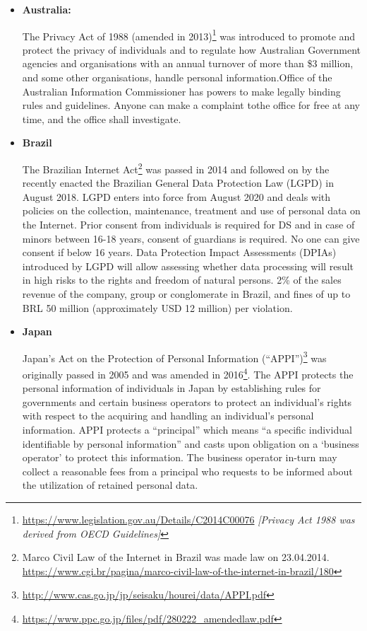 \begin{multicols}{2}
\begin{itemize}
\item[{\bf 2.}] \textbf{Australia:}

The Privacy Act of 1988 (amended in 2013)\footnote{\url{https://www.legislation.gov.au/Details/C2014C00076} \textit{[Privacy Act 1988 was derived from OECD Guidelines]}} was introduced to promote and protect the privacy of individuals and to regulate how Australian Government agencies and organisations with an annual turnover of more than \$3 million, and some other organisations, handle personal information.\break Office of the Australian Information Commissioner has powers to make legally binding rules and guidelines. Anyone can make a complaint to\break the office for free at any time, and the office shall investigate.

\item[{\bf 3.}] \textbf{Brazil}

The Brazilian Internet Act\footnote{Marco Civil Law of the Internet in Brazil was made law on 23.04.2014. \url{https://www.cgi.br/pagina/marco-civil-law-of-the-internet-in-brazil/180}} was passed in 2014 and followed on by the recently enacted the Brazilian General Data Protection Law (LGPD) in August 2018. LGPD enters into force from August 2020 and deals with policies on the collection, maintenance, treatment and use of personal data on the Internet. Prior consent from individuals is required for DS and in case of minors between 16-18 years, consent of guardians is required. No one can give consent if below 16 years. Data Protection Impact Assessments (DPIAs) introduced by LGPD will allow assessing whether data processing will result in high risks to the rights and freedom of natural persons. 2\% of the sales revenue of the company, group or conglomerate in Brazil, and fines of up to BRL 50 million (approximately USD 12 million) per violation.

\item[{\bf 4.}] \textbf{Japan}

Japan’s Act on the Protection of Personal Information (“APPI”)\footnote{\url{http://www.cas.go.jp/jp/seisaku/hourei/data/APPI.pdf}} was originally passed in 2005 and was amended in 2016\footnote{\url{https://www.ppc.go.jp/files/pdf/280222\_amendedlaw.pdf}}. The APPI protects the personal information of individuals in Japan by establishing rules for governments and certain business operators to protect an individual’s rights with respect to the acquiring and handling an individual’s personal information. APPI protects a “principal” which means “a specific individual identifiable by personal information” and casts upon obligation on a ‘business operator’ to protect this information. The business operator in-turn may collect a reasonable fees from a principal who requests to be informed about the utilization of retained personal data.


\end{itemize}
\end{multicols}
